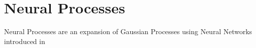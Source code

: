 \documentclass[../main.tex]{subfiles}
\begin{document}



\section{Neural Processes}

Neural Processes are an expansion of Gaussian Processes using Neural Networks introduced in \cite{garnelo2018neural}


\end{document}
